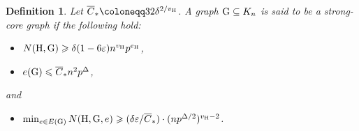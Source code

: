 \documentclass[a4paper,11pt,english,reqno]{amsart}
\numberwithin{equation}{section}
\renewcommand{\leq}{\leqslant}
\renewcommand{\geq}{\geqslant}
\newcommand{\cstar}{\overline{C}_{*}}
\newcommand{\uH}{\textup{H}}
\newcommand{\tu}[1]{\textup{#1}}
\newtheorem{definition}[theorem]{Definition}
\begin{document}
\begin{definition}
Let $\cstar\coloneqq 32\delta^{2/v_{\uH}}$. %
A graph $\tu{G}\subseteq K_{n}$ is said to be a \textit{strong-core} graph if the following hold:
\begin{itemize}
	\item[(SC1)] $N(\uH, \tu{G})\geq \delta(1-6\varepsilon) n^{v_{\uH}}p^{e_{\uH}}$,
	\item[(SC2)]$e(\tu{G})\leq \cstar n^{2}p^\Delta$,
\end{itemize}
and
\begin{itemize}
	\item[(SC3)]$\min_{e\in E(\tu{G})} N(\uH, \tu{G}, e)\geq (\delta \varepsilon/\cstar)\cdot (np^{\Delta/2})^{v_{\uH}-2}$. 
\end{itemize}
\end{definition}
\end{document}
